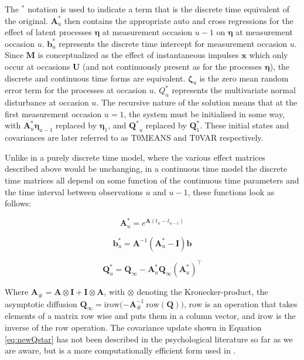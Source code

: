 \documentclass[nojss]{jss}\usepackage[]{graphicx}\usepackage[]{color}
\newcommand{\vect}[1]{\boldsymbol{\mathbf{#1}}}
\begin{document}
The $^*$ notation is used to indicate a term that is the discrete time equivalent of the original. $\vect{A}^*_u$ then contains the appropriate auto and cross regressions for the effect of latent processes $\vect{\eta}$ at measurement occasion $u-1$ on $\vect{\eta}$ at measurement occasion $u$. $\vect{b}^*_u$ represents the discrete time intercept for measurement occasion $u$. Since $\vect{M}$ is conceptualized as the effect of instantaneous impulses $\vect{x}$ which only occur at occasions $\vect{U}$ (and not continuously present as for the processes $\vect{\eta}$), the discrete and continuous time forms are equivalent. $\vect{\zeta}_u$ is the zero mean random error term for the processes at occasion $u$. $Q^*_u$ represents the multivariate normal disturbance at occasion $u$. The recursive nature of the solution means that at the first measurement occasion $u = 1$, the system must be initialised in some way, with $\vect{A}^*_u \vect{\eta}_{u-1}$ replaced by $\vect{\eta}_{1}$, and $\vect{Q^*}_u$ replaced by $\vect{Q}^*_{1}$. These initial states and covariances are later referred to as T0MEANS and T0VAR respectively.

Unlike in a purely discrete time model, where the various effect matrices described above would be unchanging, in a continuous time model the discrete time matrices all depend on some function of the continuous time parameters and the time interval between observations $u$ and $u-1$, these functions look as follows:

\begin{equation}
	\vect{A}^*_u = e^{\vect{A} (t_u - t_{u-1} )}  
\end{equation}

\begin{equation}
	\vect{b}^*_u = \vect{A}^{-1} (\vect{A}^*_u - \vect{I})\vect{b}  
\end{equation}

\begin{equation}
\label{eq:newQstar}
\vect{Q}^*_u = \vect{Q}_{\infty} - \vect{A}^*_u \vect{Q}_{\infty} (\vect{A}^*_u)^\top
\end{equation}

Where $\vect{A}_{\#} = \vect{A} \otimes \vect{I} + \vect{I} \otimes \vect{A} $, with $\otimes$ denoting the Kronecker-product, the asymptotic diffusion $\vect{Q}_{\infty} = \text{irow} \big( \vect{-A}_{\#}^{-1} \: \text{row} (\vect{Q}) \big)$, $\text{row}$ is an operation that takes elements of a matrix row wise and puts them in a column vector, and $\text{irow}$ is the inverse of the $\text{row}$ operation. The covariance update shown in Equation \ref{eq:newQstar} has not been described in the psychological literature so far as we are aware, but is a more computationally efficient form used in \citet{tomasson2013computational}.
\end{document}
